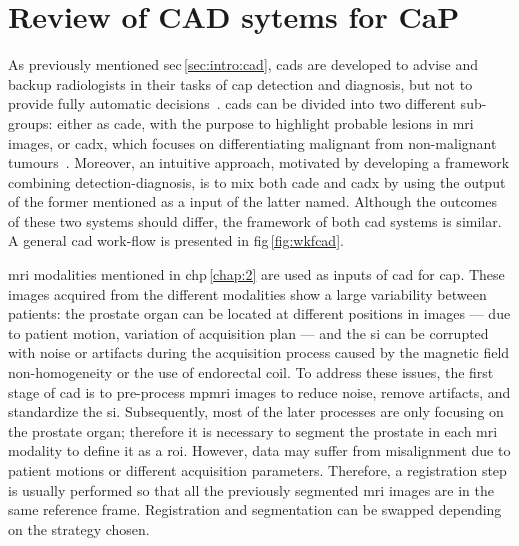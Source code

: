 \acresetall
\chapter{Review of CAD sytems for CaP}\label{chap:3}
\ifpdf
    \graphicspath{{3_review/figures/}}
\else
    \graphicspath{{3_review/figures/}}
\fi



As previously mentioned \acs{sec}\,\ref{sec:intro:cad}, \acp{cad} are developed to advise and backup radiologists in their tasks of \ac{cap} detection and diagnosis, but not to provide fully automatic decisions~\cite{Giger2008}.
\acp{cad} can be divided into two different sub-groups: either as \ac{cade}, with the purpose to highlight probable lesions in \ac{mri} images, or \ac{cadx}, which focuses on differentiating malignant from non-malignant tumours~\cite{Giger2008}.
Moreover, an intuitive approach, motivated by developing a framework combining detection-diagnosis, is to mix both \ac{cade} and \ac{cadx} by using the output of the former mentioned as a input of the latter named.
Although the outcomes of these two systems should differ, the framework of both \ac{cad} systems is similar.
A general \ac{cad} work-flow is presented in \acs{fig}\,\ref{fig:wkfcad}.

\ac{mri} modalities mentioned in \acs{chp}\,\ref{chap:2} are used as inputs of \ac{cad} for \ac{cap}.
These images acquired from the different modalities show a large variability between patients: the prostate organ can be located at different positions in images --- due to patient motion, variation of acquisition plan --- and the \ac{si} can be corrupted with noise or artifacts during the acquisition process caused by the magnetic field non-homogeneity or the use of endorectal coil.
To address these issues, the first stage of \ac{cad} is to pre-process \ac{mpmri} images to reduce noise, remove artifacts, and standardize the \ac{si}.
Subsequently, most of the later processes are only focusing on the prostate organ; therefore it is necessary to segment the prostate in each \ac{mri} modality to define it as a \ac{roi}.
However, data may suffer from misalignment due to patient motions or different acquisition parameters.
Therefore, a registration step is usually performed so that all the previously segmented \ac{mri} images are in the same reference frame.
Registration and segmentation can be swapped depending on the strategy chosen.

